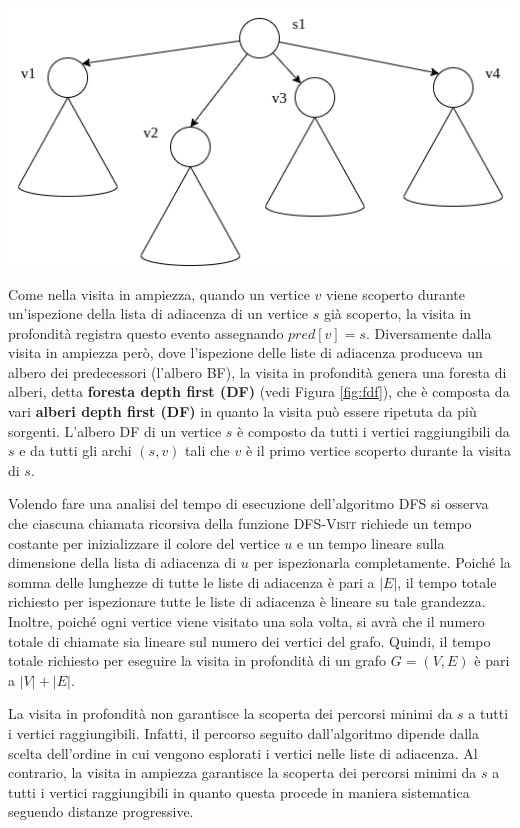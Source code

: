 \begin{center}
	\includegraphics[scale=0.55]{res/DFS_forest}
	\label{fig:fdf}
\end{center}

Come nella visita in ampiezza, quando un vertice $v$ viene scoperto durante un'ispezione della lista di adiacenza di un vertice $s$ già scoperto, la visita in profondità registra questo evento assegnando $pred[v]=s$. Diversamente dalla visita in ampiezza però, dove l'ispezione delle liste di adiacenza produceva un albero dei predecessori (l'albero BF), la visita in profondità genera una foresta di alberi, detta \textbf{foresta depth first (DF)} (vedi Figura \ref{fig:fdf}), che è composta da vari \textbf{alberi depth first (DF)} in quanto la visita può essere ripetuta da più sorgenti. L'albero DF di un vertice $s$ è composto da tutti i vertici raggiungibili da $s$ e da tutti gli archi $(s,v)$ tali che $v$ è il primo vertice scoperto durante la visita di $s$.

Volendo fare una analisi del tempo di esecuzione dell'algoritmo \textsc{DFS} si osserva che ciascuna chiamata ricorsiva della funzione \textsc{DFS-Visit} richiede un tempo costante per inizializzare il colore del vertice $u$ e un tempo lineare sulla dimensione della lista di adiacenza di $u$ per ispezionarla completamente. Poiché la somma delle lunghezze di tutte le liste di adiacenza è pari a $|E|$, il tempo totale richiesto per ispezionare tutte le liste di adiacenza è lineare su tale grandezza. Inoltre, poiché ogni vertice viene visitato una sola volta, si avrà che il numero totale di chiamate sia lineare sul numero dei vertici del grafo. Quindi, il tempo totale richiesto per eseguire la visita in profondità di un grafo $G=(V,E)$ è pari a $|V|+|E|$.


\begin{osservation}
		La visita in profondità non garantisce la scoperta dei percorsi minimi da $s$ a tutti i vertici raggiungibili. Infatti, il percorso seguito dall'algoritmo dipende dalla scelta dell'ordine in cui vengono esplorati i vertici nelle liste di adiacenza. Al contrario, la visita in ampiezza garantisce la scoperta dei percorsi minimi da $s$ a tutti i vertici raggiungibili in quanto questa procede in maniera sistematica seguendo distanze progressive.
\end{osservation}

